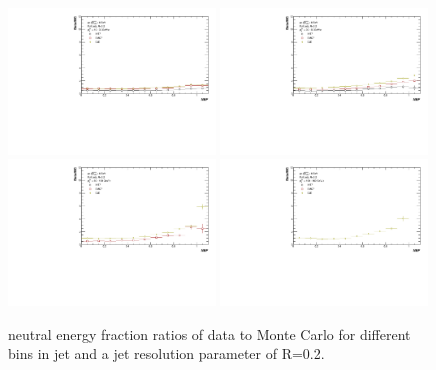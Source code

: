 \begin{figure}[hbt!]
    \centering
    \begin{multicols}{2}
            \includegraphics[width=0.49\textwidth]{figures/TriggerBias/NEF/hNEF_ptBin1_R02.pdf}
            \includegraphics[width=0.49\textwidth]{figures/TriggerBias/NEF/hNEF_ptBin2_R02.pdf}
        \vfill\null
        \columnbreak
            \includegraphics[width=0.49\textwidth]{figures/TriggerBias/NEF/hNEF_ptBin3_R02.pdf}
            \includegraphics[width=0.49\textwidth]{figures/TriggerBias/NEF/hNEF_ptBin4_R02.pdf}
        \vfill\null
    \end{multicols}
    \caption{neutral energy fraction ratios of \pp data to Monte Carlo for different bins in jet \pT and a jet resolution parameter of R=0.2.}
    \label{fig:TriggerBiasNEFR02}
\end{figure}

